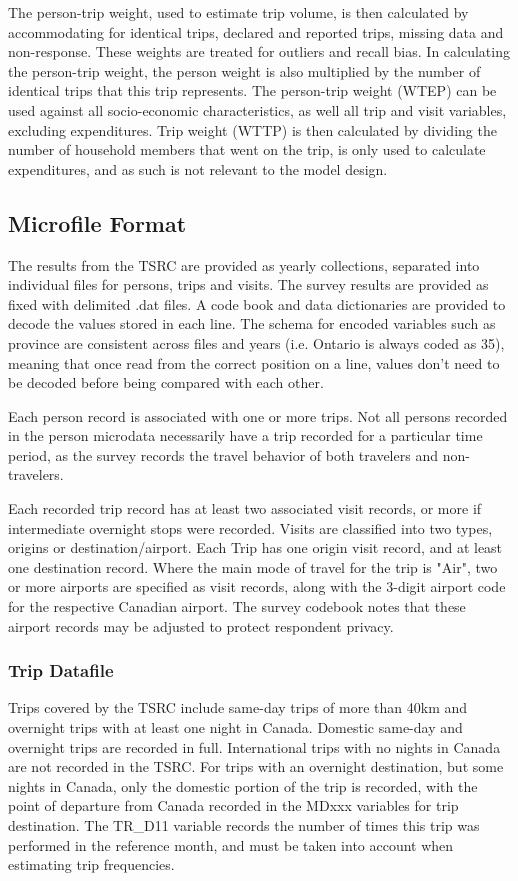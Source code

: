 The person-trip weight, used to estimate trip volume, is then calculated by accommodating for identical trips, declared and reported trips, missing data and non-response. These weights are treated for outliers and recall bias. In calculating the person-trip weight, the person weight is also multiplied by the number of identical trips that this trip represents. The person-trip weight (WTEP) can be used against all socio-economic characteristics, as well all trip and visit variables, excluding expenditures. Trip weight (WTTP) is then calculated by dividing the number of household members that went on the trip, is only used to calculate expenditures, and as such is not relevant to the model design. 

\subsection{Microfile Format}
The results from the TSRC are provided as yearly collections, separated into individual files for persons, trips and visits. The survey results are provided as fixed with delimited .dat files. A code book and data dictionaries are provided to decode the values stored in each line. The schema for encoded variables such as province are consistent across files and years (i.e. Ontario is always coded as 35), meaning that once read from the correct position on a line, values don't need to be decoded before being compared with each other. 

Each person record is associated with one or more trips. Not all persons recorded in the person microdata necessarily have a trip recorded for a particular time period, as the survey records the travel behavior of both travelers and non-travelers.

Each recorded trip record has at least two associated visit records, or more if intermediate overnight stops were recorded. Visits are classified into two types, origins or destination/airport. Each Trip has one origin visit record, and at least one destination record. Where the main mode of travel for the trip is "Air", two or more airports are specified as visit records, along with the 3-digit airport code for the respective Canadian airport. The survey codebook notes that these airport records may be adjusted to protect respondent privacy.

\subsubsection*{Trip Datafile}
Trips covered by the TSRC include same-day trips of more than 40km and overnight trips with at least one night in Canada. Domestic same-day and overnight trips are recorded in full. International trips with no nights in Canada are not recorded in the TSRC. For trips with an overnight destination, but some nights in Canada, only the domestic portion of the trip is recorded, with the point of departure from Canada recorded in the MDxxx variables for trip destination. The TR\_D11 variable records the number of times this trip was performed in the reference month, and must be taken into account when estimating trip frequencies.

